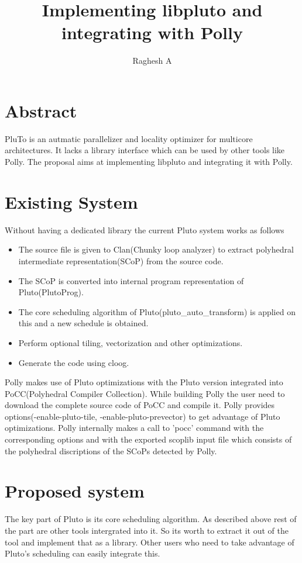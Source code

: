 \documentclass[a4paper,12pt]{article}
\title{Implementing libpluto and integrating with Polly}
\author{Raghesh A}
\begin{document}
\maketitle

\section{Abstract}
PluTo is an autmatic parallelizer and locality optimizer for multicore
architectures. It lacks a library interface which can be used by other
tools like Polly. The proposal aims at implementing libpluto and integrating
it with Polly.

\section{Existing System}

Without having a dedicated library the current Pluto system works as follows
\begin{itemize}
\item The source file is given to Clan(Chunky loop analyzer) to extract polyhedral
      intermediate representation(SCoP) from the source code.
\item The SCoP is converted into internal program representation of Pluto(PlutoProg).
\item The core scheduling algorithm of Pluto(pluto\_auto\_transform) is applied on
      this and a new schedule is obtained.
\item Perform optional tiling, vectorization and other optimizations.
\item Generate the code using cloog.
\end{itemize}
Polly makes use of Pluto optimizations with the Pluto version integrated into 
PoCC(Polyhedral Compiler Collection). While building Polly the user need to
download the complete source code of PoCC and compile it. Polly provides
options(-enable-pluto-tile, -enable-pluto-prevector) to get advantage of
Pluto optimizations. Polly internally makes a call to 'pocc' command with the 
corresponding options and with the exported scoplib input file which consists
of the polyhedral discriptions of the SCoPs detected by Polly.

\section{Proposed system}
The key part of Pluto is its core scheduling algorithm. As described above rest
of the part are other tools intergrated into it. So its worth to extract it
out of the tool and implement that as a library. Other users who
need to take advantage of Pluto's scheduling can easily integrate this.
\end{document}
